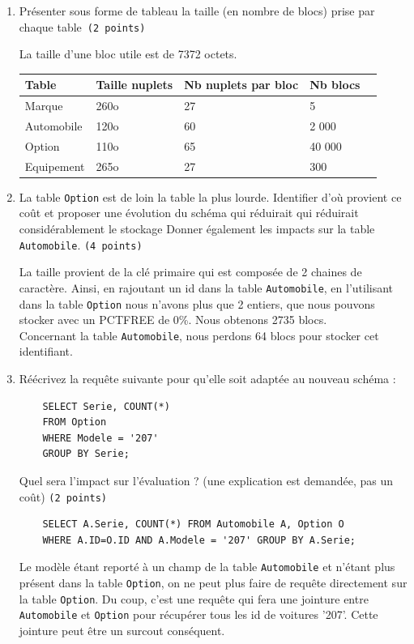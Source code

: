 \begin{enumerate}
    \item Présenter sous forme de tableau la taille (en nombre de blocs) prise par chaque table~{\tt (2~points)}
\begin{solution}
    La taille d'une bloc utile est de 7372 octets.\\
    \begin{tabular}{|l|l|l|l|l|}
    \hline
    \textbf{Table} & {\bf Taille nuplets}    & {\bf Nb nuplets par bloc} & {\bf Nb blocs}\\
    \hline
    \hline
    Marque      & 260o  & 27    & 5\\
    Automobile  & 120o  & 60    & 2 000\\
    Option      & 110o  & 65    & 40 000\\
    Equipement  & 265o  & 27    & 300\\
    \hline
    \end{tabular}
\end{solution}
    \item La table {\tt Option} est de loin la table la plus lourde. Identifier d'où provient ce coût et proposer 
       une évolution du schéma  qui réduirait qui réduirait considérablement le stockage 
  Donner également les impacts sur la table {\tt Automobile}. {\tt (4~points)}
\begin{solution}
    La taille provient de la clé primaire qui est composée de 2 chaines de caractère. Ainsi, en rajoutant un id dans la table {\tt Automobile}, en l'utilisant dans la table {\tt Option} nous n'avons plus que 2 entiers, que nous pouvons stocker avec un PCTFREE de 0\%. Nous obtenons 2735 blocs.\\
    Concernant la table {\tt Automobile}, nous perdons 64 blocs pour stocker cet identifiant.
\end{solution}

    \item Réécrivez la requête suivante pour qu'elle soit adaptée au nouveau schéma :

\begin{verbatim}
    SELECT Serie, COUNT(*) 
    FROM Option 
    WHERE Modele = '207' 
    GROUP BY Serie;
\end{verbatim}
    Quel sera l'impact sur l'évaluation ? (une explication est demandée, pas un coût) {\tt (2~points)}
\begin{solution}
    \begin{verbatim}
    SELECT A.Serie, COUNT(*) FROM Automobile A, Option O
    WHERE A.ID=O.ID AND A.Modele = '207' GROUP BY A.Serie;
    \end{verbatim}
    Le modèle étant reporté à un champ de la table {\tt Automobile} et n'étant plus présent dans la table {\tt Option}, 
    on ne peut plus faire de requête directement sur la table {\tt Option}. Du coup, 
    c'est une requête qui fera une jointure entre {\tt Automobile} et {\tt Option} 
    pour récupérer tous les id de voitures '207'. Cette jointure peut être un surcout conséquent.
\end{solution}


\end{enumerate}
